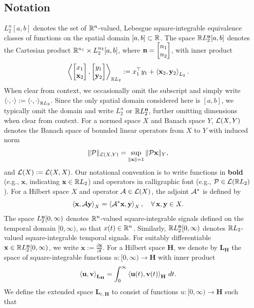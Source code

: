 \subsection{Notation}
$L_2^n[a,b]$ denotes the set of $\mathbb{R}^n$-valued, Lebesgue square-integrable equivalence classes of functions on the spatial domain $[a,b]\subset\mathbb{R}$. The space $\mathbb{R} L_2^{\mathbf{n}}[a,b]$ denotes the Cartesian product $\mathbb{R}^{n_1} \times L_2^{n_2}[a,b]$, where $\mathbf{n} = \begin{bmatrix}n_1 \\ n_2\end{bmatrix}$, with inner product
\begin{equation*}
	\left\langle \begin{bmatrix}x_1 \\ \mathbf{x}_2\end{bmatrix}, \begin{bmatrix}y_1 \\ \mathbf{y}_2\end{bmatrix} \right\rangle_{\mathbb{R} L_2}
	:= x_1^\top y_1 + \left\langle \mathbf{x}_2, \mathbf{y}_2 \right\rangle_{L_2}.
\end{equation*} When clear from context, we occasionally omit the subscript and simply write $\left\langle \cdot, \cdot \right\rangle := \left\langle \cdot, \cdot \right\rangle_{\mathbb{R} L_2}$. Since the only spatial domain considered here is $[a,b]$, we typically omit the domain and write $L_2^n$ or $\mathbb{R} L_2^{\mathbf{n}}$, further omitting dimensions when clear from context. For a normed space $X$ and Banach space $Y$, $\mathcal{L}(X,Y)$ denotes the Banach space of bounded linear operators from $X$ to $Y$ with induced norm
\[
	\|\mathcal{P}\|_{\mathcal{L}(X,Y)} = \sup_{\|\mathbf{x}\| = 1} \|\mathcal{P} \mathbf{x}\|_Y,
\] and $\mathcal{L}(X) := \mathcal{L}(X,X)$. Our notational convention is to write functions in \textbf{bold} (e.g., $\mathbf{x}$, indicating $\mathbf{x} \in \mathbb{R} L_2$) and operators in calligraphic font (e.g., $\mathcal{P} \in \mathcal{L}(\mathbb{R} L_2)$).
For a Hilbert space $X$ and operator $\mathcal{A} \in \mathcal{L}(X)$, the adjoint $\mathcal{A}^*$ is defined by
\[
	\left\langle \mathbf{x}, \mathcal{A} \mathbf{y} \right\rangle_X = \left\langle \mathcal{A}^* \mathbf{x}, \mathbf{y} \right\rangle_X,
	\quad \forall\, \mathbf{x},\mathbf{y} \in X.
\] The space $L_2^{\mathbf{n}}[0,\infty)$ denotes $\mathbb{R}^n$-valued square-integrable signals defined on the temporal domain $[0,\infty)$,
 so that $x(t) \in \mathbb{R}^n$. Similarly, $\mathbb{R} L_2^{\mathbf{n}}[0,\infty)$ denotes $\mathbb{R} L_2$-valued square-integrable temporal signals. 
 For suitably differentiable $\mathbf{x} \in \mathbb{R} L_2^{\mathbf{n}}[0,\infty)$, we write $\mathbf{\dot{x}} := \frac{\partial \mathbf{x}}{\partial t}$. For a Hilbert space $\mathbf{H}$, we denote by $\mathbf{L}_{\mathbf{H}}$ the space of square-integrable functions $u : [0,\infty) \to \mathbf{H}$ with inner product
\[
	\left\langle \mathbf{u}, \mathbf{v} \right\rangle_{\mathbf{L}_{\mathbf{H}}}
	= \int_0^\infty \left\langle \mathbf{u}(t), \mathbf{v}(t) \right\rangle_{\mathbf{H}}\, dt.
\] We define the extended space $\mathbf{L}_{e,\mathbf{H}}$ to consist of functions $u : [0,\infty) \to \mathbf{H}$ such that
